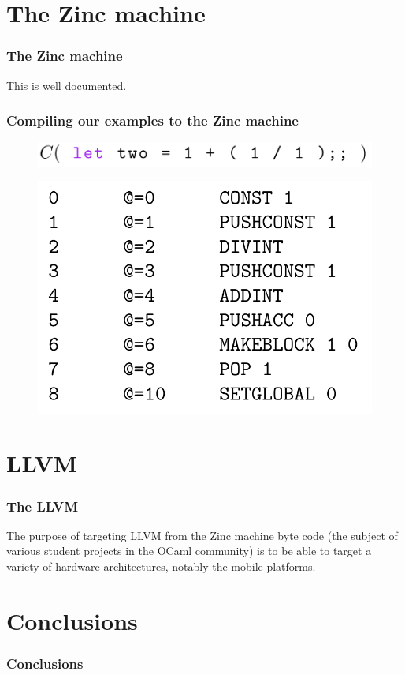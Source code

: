 \documentclass{beamer}
\begin{document}
  \section{The Zinc machine}
  \begin{frame}
    \frametitle{The Zinc machine}
    This is well documented.
    
  \end{frame}
  \begin{frame}
    \frametitle{Compiling our examples to the Zinc machine}
    \begin{figure}[ht]
      \begin{center}        
        \includegraphics[width=\textwidth,height=0.075\textheight,keepaspectratio]{pipelinefigures/CompilerPathwayArithmeticExampleCompilationInvocation.pdf}
      \end{center}      
    \end{figure}        
    \begin{figure}[ht]
      \begin{center}        
        \includegraphics[width=\textwidth,height=0.6\textheight,keepaspectratio]{pipelinefigures/CompilationPathwayArithmeticExampleBytecode.pdf}
      \end{center}      
    \end{figure}        
  \end{frame}
  \section{LLVM}
  \begin{frame}
    \frametitle{The LLVM} The purpose of targeting LLVM from the Zinc
    machine byte code (the subject of various student projects in the
    OCaml community) is to be able to target a variety of hardware
    architectures, notably the mobile platforms.
  \end{frame}
  \section{Conclusions}
  \begin{frame}
    \frametitle{Conclusions}
  \end{frame}
\end{document}
